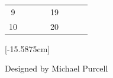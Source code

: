 \documentclass[landscape, a4paper, parskip=half, DIV=13]{scrartcl}
\begin{document}
\begin{center}
{\begin{center}
\begin{tabular}{c@{\hskip 6pt}c@{\hskip 3pt}c@{\hskip 3pt}c@{\hskip 6pt}c@{\hskip 6pt}c@{\hskip 3pt}c@{\hskip 3pt}c}
\phantom{1}9 & \raisebox{-0.25ex}{\drawonestar{}} & \raisebox{-0.25ex}{\drawfourstar{}} & \raisebox{-0.25ex}{\drawsixstar{}} & 19 & \raisebox{-0.25ex}{\drawtwostar{}} & \raisebox{-0.25ex}{\drawthreestar{}} & \raisebox{-0.25ex}{\drawfivestar{}} \\[0.5ex]
10 & \raisebox{-0.25ex}{\drawonestar{}} & \raisebox{-0.25ex}{\drawfivestar{}} & \raisebox{-0.25ex}{\drawsixstar{}} & 20 & \raisebox{-0.25ex}{\drawtwostar{}} & \raisebox{-0.25ex}{\drawthreestar{}} & \raisebox{-0.25ex}{\drawfourstar{}} \\ \bottomrule
\end{tabular}%
\end{center}
}[-15.5875cm]

\vfill

{\LARGE Designed by Michael Purcell}
\normalmarginpar{}
\reversemarginpar{}
\end{center}
\end{document}
